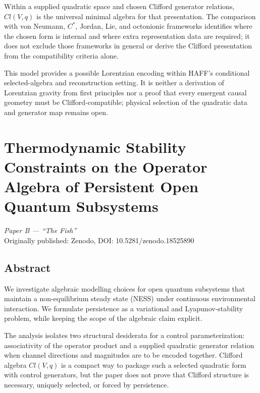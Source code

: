 \documentclass[12pt,a4paper,openany]{book}
\begin{document}
Within a supplied quadratic space and chosen Clifford generator relations, $Cl(V,q)$ is the universal minimal algebra for that presentation.
The comparison with von Neumann, $C^*$, Jordan, Lie, and octonionic frameworks identifies where the chosen form is internal and where extra representation data are required; it does not exclude those frameworks in general or derive the Clifford presentation from the compatibility criteria alone.

This model provides a possible Lorentzian encoding within HAFF's conditional selected-algebra and reconstruction setting.
It is neither a derivation of Lorentzian gravity from first principles nor a proof that every emergent causal geometry must be Clifford-compatible; physical selection of the quadratic data and generator map remains open.


\chapter{Thermodynamic Stability Constraints on the Operator Algebra of Persistent Open Quantum Subsystems}
\label{chap:paperB}

\begin{center}
\textit{Paper B --- ``The Fish''}\\[0.5em]
Originally published: Zenodo, DOI: 10.5281/zenodo.18525890
\end{center}

\bigskip

\section*{Abstract}
We investigate algebraic modelling choices for open quantum subsystems
that maintain a non-equilibrium steady state (NESS) under continuous
environmental interaction.  We formulate persistence as a variational
and Lyapunov-stability problem, while keeping the scope of the algebraic
claim explicit.

The analysis isolates two structural desiderata for a control
parameterization: associativity of the operator product and a supplied
quadratic generator relation when channel directions and magnitudes are
to be encoded together.  Clifford algebra $Cl(V,q)$ is a compact way to
package such a selected quadratic form with control generators, but the
paper does not prove that Clifford structure is necessary, uniquely
selected, or forced by persistence.
\end{document}
